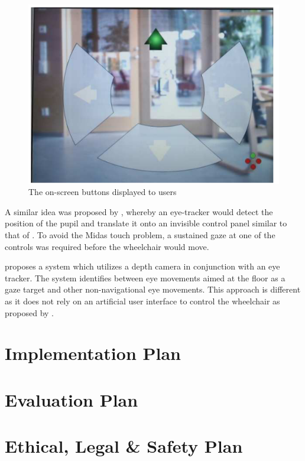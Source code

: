 \documentclass[12pt,a4paper]{report}
\begin{document}
\begin{figure}[h!]
	\begin{center}
		\includegraphics[scale=0.4]{Images/Literature/Wastlund_AR_Screen.png}
		\caption{The on-screen buttons displayed to users \citep{Wastlund2010}}
	\end{center}
\end{figure}

A similar idea was proposed by \cite{Arai2011}, whereby an eye-tracker would detect the position of the pupil and translate it onto an invisible control panel similar to that of \cite{Wastlund2010}. To avoid the Midas touch problem, a sustained gaze at one of the controls was required before the wheelchair would move.

\cite{Raymond2018} proposes a system which utilizes a depth camera in conjunction with an eye tracker. The system identifies between eye movements aimed at the floor as a gaze target and other non-navigational eye movements. This approach is different as it does not rely on an artificial user interface to control the wheelchair as proposed by \cite{Arai2011, Wastlund2010}.


\newpage
\chapter{Implementation Plan}

\newpage
\chapter{Evaluation Plan}

\newpage
\chapter{Ethical, Legal \& Safety Plan}

\newpage



\end{document}
